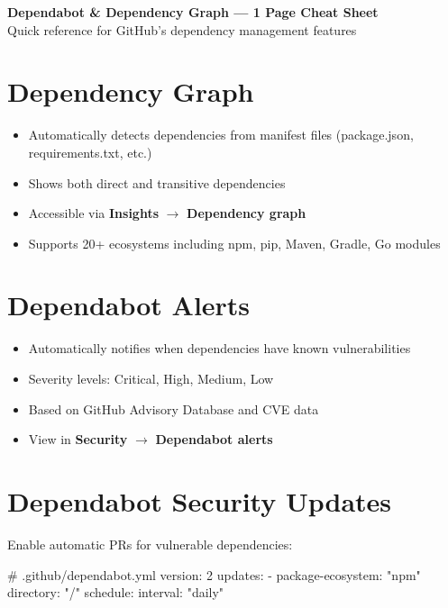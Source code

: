 \documentclass[10pt,letterpaper]{article}
\begin{document}
\begin{center}
{\Large \textbf{Dependabot \& Dependency Graph --- 1 Page Cheat Sheet}}\\[4pt]
{\color{Gray}\small Quick reference for GitHub's dependency management features}
\end{center}

\section{Dependency Graph}

\begin{itemize}
  \item Automatically detects dependencies from manifest files (package.json, requirements.txt, etc.)
  \item Shows both direct and transitive dependencies
  \item Accessible via \textbf{Insights} $\rightarrow$ \textbf{Dependency graph}
  \item Supports 20+ ecosystems including npm, pip, Maven, Gradle, Go modules
\end{itemize}

\section{Dependabot Alerts}

\begin{itemize}
  \item Automatically notifies when dependencies have known vulnerabilities
  \item Severity levels: Critical, High, Medium, Low
  \item Based on GitHub Advisory Database and CVE data
  \item View in \textbf{Security} $\rightarrow$ \textbf{Dependabot alerts}
\end{itemize}

\section{Dependabot Security Updates}

Enable automatic PRs for vulnerable dependencies:

\begin{yamlcode}
# .github/dependabot.yml
version: 2
updates:
  - package-ecosystem: "npm"
    directory: "/"
    schedule:
      interval: "daily"
\end{yamlcode}
\end{document}
